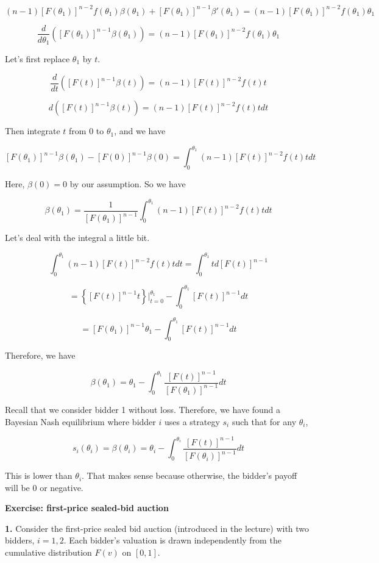 \documentclass[12pt, oneside]{article}
\begin{document}
\[
(n - 1)[F(\theta_1)]^{n-2} f(\theta_1) \beta(\theta_1) + [F(\theta_1)]^{n-1} \beta'(\theta_1) = (n - 1)[F(\theta_1)]^{n-2} f(\theta_1) \theta_1
\]

\[
\frac{d}{d\theta_1} ([F(\theta_1)]^{n-1} \beta(\theta_1)) = (n - 1)[F(\theta_1)]^{n-2} f(\theta_1) \theta_1
\]

Let's first replace \( \theta_1 \) by \( t \).

\[
\frac{d}{dt} ([F(t)]^{n-1} \beta(t)) = (n - 1)[F(t)]^{n-2} f(t) t
\]

\[
d ([F(t)]^{n-1} \beta(t)) = (n - 1)[F(t)]^{n-2} f(t) t dt
\]

Then integrate \( t \) from \( 0 \) to \( \theta_1 \), and we have

\[
[F(\theta_1)]^{n-1} \beta(\theta_1) - [F(0)]^{n-1} \beta(0) = \int_0^{\theta_1} (n - 1)[F(t)]^{n-2} f(t) t dt
\]

Here, \( \beta(0) = 0 \) by our assumption. So we have

\[
\beta(\theta_1) = \frac{1}{[F(\theta_1)]^{n-1}} \int_0^{\theta_1} (n - 1)[F(t)]^{n-2} f(t) t dt
\]

Let's deal with the integral a little bit.

\[
\int_0^{\theta_1} (n - 1)[F(t)]^{n-2} f(t) t dt = \int_0^{\theta_1} t d[F(t)]^{n-1}
\]

\[
= \left\{ [F(t)]^{n-1} t \right\} \bigg|_{t=0}^{\theta_1} - \int_0^{\theta_1} [F(t)]^{n-1} dt
\]

\[
= [F(\theta_1)]^{n-1} \theta_1 - \int_0^{\theta_1} [F(t)]^{n-1} dt
\]

Therefore, we have

\[
\beta(\theta_1) = \theta_1 - \int_0^{\theta_1} \frac{[F(t)]^{n-1}}{[F(\theta_1)]^{n-1}} dt
\]

Recall that we consider bidder 1 without loss. Therefore, we have found a Bayesian Nash equilibrium where bidder \( i \) uses a strategy \( s_i \) such that for any \( \theta_i \),

\[
s_i(\theta_i) = \beta(\theta_i) = \theta_i - \int_0^{\theta_i} \frac{[F(t)]^{n-1}}{[F(\theta_i)]^{n-1}} dt
\]

This is lower than \( \theta_i \). That makes sense because otherwise, the bidder's payoff will be 0 or negative.

\textbf{Exercise: first-price sealed-bid auction}

\noindent
\textbf{1.} Consider the first-price sealed bid auction (introduced in the lecture) with two bidders, \( i = 1,2 \).
Each bidder’s valuation is drawn independently from the cumulative distribution \( F(v) \) on \( [0,1] \).
\end{document}
